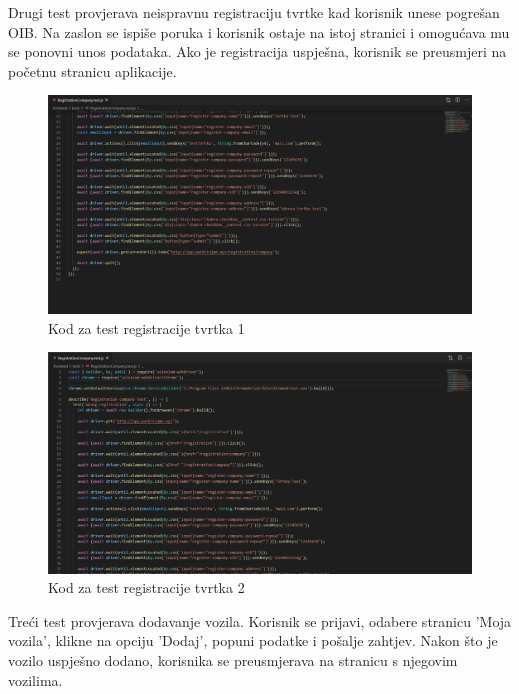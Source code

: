 			
			Drugi test provjerava neispravnu registraciju tvrtke kad korisnik unese pogrešan OIB. Na zaslon se ispiše poruka i korisnik ostaje na istoj stranici i omogućava mu se ponovni unos podataka. Ako je registracija uspješna, korisnik se preusmjeri na početnu stranicu aplikacije.
			
			\begin{figure}[H]
				\includegraphics[width=1\linewidth]{images/RegistrationCompany1.png}
				\caption{Kod za test registracije tvrtka 1}
				\label{fig:RegistrationCompany test - kod1} 
			\end{figure}
			
			
			\begin{figure}[H]
				\includegraphics[width=1\linewidth]{images/RegistrationCompany2.png}
				\caption{Kod za test registracije tvrtka 2}
				\label{fig:RegistrationCompany test - kod2} 
			\end{figure}
			
			
			Treći test provjerava dodavanje vozila. Korisnik se prijavi, odabere stranicu 'Moja vozila', klikne na opciju 'Dodaj', popuni podatke i pošalje zahtjev. Nakon što je vozilo uspješno dodano, korisnika se preusmjerava na stranicu s njegovim vozilima.
						

